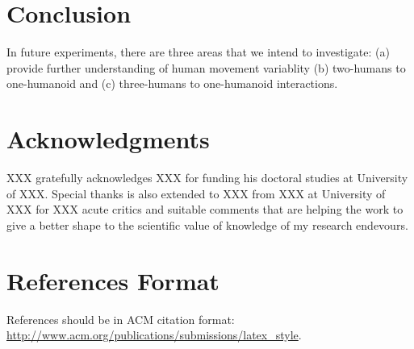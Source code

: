 \documentclass{sigchi}
\begin{document}
\section{Conclusion}



In future experiments, there are three areas that we intend to investigate:
(a) provide further understanding of human movement variablity
(b) two-humans to one-humanoid and
(c) three-humans to one-humanoid interactions.







\section{Acknowledgments}

XXX gratefully acknowledges XXX for funding his doctoral studies at
University of XXX. Special thanks is also extended to XXX from XXX at
University of XXX for XXX
acute critics and suitable comments that are helping the work to give a better
shape to the scientific value of knowledge of my research endevours.


%
%
%
%
%
\balance{}

\section{References Format}

References should be in ACM citation format:
\url{http://www.acm.org/publications/submissions/latex_style}.


\balance{}



\end{document}
